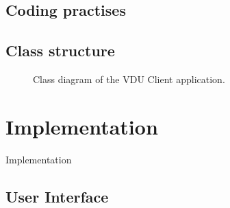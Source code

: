 \section{Coding practises}

\section{Class structure}

\begin{figure}[htb]
	\noindent
	\caption{Class diagram of the VDU Client application.}
	\label{vduclassdiagram}
\end{figure}

\chapter{Implementation}
\label{ch6}
Implementation

\section{User Interface}

